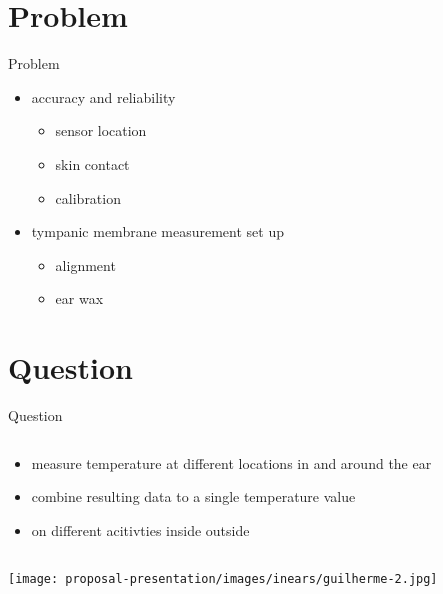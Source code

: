 \documentclass[en]{sdqbeamer}
\begin{document}
\section{Problem}
\begin{frame}{Problem}
    \begin{itemize}
        \item accuracy and reliability
        \begin{itemize}
            \item sensor location
            \item skin contact
            \item calibration
        \end{itemize}
        \item tympanic membrane measurement set up
        \begin{itemize}
            \item alignment
            \item ear wax
        \end{itemize}
    \end{itemize}
\end{frame}

\section{Question}
\begin{frame}[fragile]{Question}
    \begin{column}{0.38\textwidth}
        \begin{itemize}
            \item measure temperature at different locations in and around the ear
            \item combine resulting data to a single temperature value
            \item on different acitivties inside outside
        \end{itemize}
    \end{column}
    \begin{column}{0.58\textwidth}    
        \texttt{[image: proposal-presentation/images/inears/guilherme-2.jpg]}
    \end{column}
\end{frame}
\end{document}
